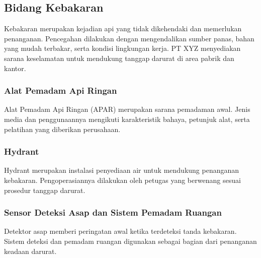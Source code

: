 
\subsection{Bidang Kebakaran}

Kebakaran merupakan kejadian api yang tidak dikehendaki dan memerlukan penanganan. Pencegahan dilakukan dengan mengendalikan sumber panas, bahan yang mudah terbakar, serta kondisi lingkungan kerja. PT XYZ menyediakan sarana keselamatan untuk mendukung tanggap darurat di area pabrik dan kantor.

\Needspace{6.8cm}
\subsubsection{Alat Pemadam Api Ringan}

Alat Pemadam Api Ringan (APAR) merupakan sarana pemadaman awal. Jenis media dan penggunaannya mengikuti karakteristik bahaya, petunjuk alat, serta pelatihan yang diberikan perusahaan.


\Needspace{6.8cm}
\subsubsection{Hydrant}

Hydrant merupakan instalasi penyediaan air untuk mendukung penanganan kebakaran. Pengoperasiannya dilakukan oleh petugas yang berwenang sesuai prosedur tanggap darurat.


\Needspace{6.8cm}
\subsubsection{Sensor Deteksi Asap dan Sistem Pemadam Ruangan}

Detektor asap memberi peringatan awal ketika terdeteksi tanda kebakaran. Sistem deteksi dan pemadam ruangan digunakan sebagai bagian dari penanganan keadaan darurat.


